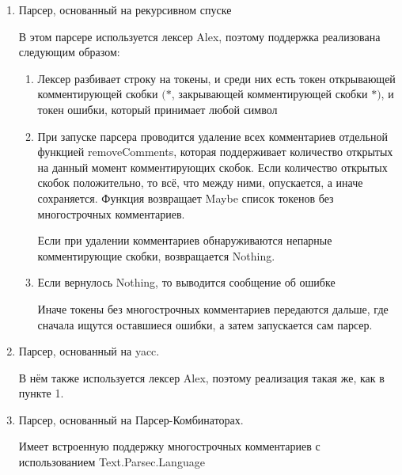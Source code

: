 \documentclass[12pt]{article}
\begin{document}
	\begin{enumerate}
		\item
            Парсер, основанный на рекурсивном спуске

            В этом парсере используется лексер Alex, поэтому поддержка реализована следующим образом:

            \begin{enumerate}
                \item Лексер разбивает строку на токены, и среди них есть токен открывающей комментирующей скобки $(*$, закрывающей комментирующей скобки $*)$, и токен ошибки, который принимает любой символ
                \item При запуске парсера проводится удаление всех комментариев отдельной функцией removeComments, которая поддерживает количество открытых на данный момент комментирующих скобок. Если количество открытых скобок положительно, то всё, что между ними, опускается, а иначе сохраняется. Функция возвращает Maybe список токенов без многострочных комментариев.

                    Если при удалении комментариев обнаруживаются непарные комментирующие скобки, возвращается Nothing.

                \item Если вернулось Nothing, то выводится сообщение об ошибке

                    Иначе токены без многострочных комментариев передаются дальше, где сначала ищутся оставшиеся ошибки, а затем запускается сам парсер.
            \end{enumerate}
		\item
            Парсер, основанный на yacc.

            В нём также используется лексер Alex, поэтому реализация такая же, как в пункте 1.
		\item
            Парсер, основанный на Парсер-Комбинаторах.

            Имеет встроенную поддержку многострочных комментариев с использованием Text.Parsec.Language
	\end{enumerate}
\end{document}
